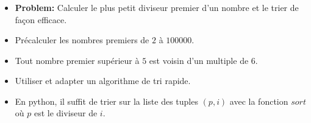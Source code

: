 \begin{frame}
    \frametitle{\problemtitle}
    \begin{itemize}
        \item<+-> \textbf{Problem:} Calculer le plus petit diviseur premier d'un nombre et le trier de façon efficace.
        \item<+-> Précalculer les nombres premiers de $2$ à $100000$.
        \item<+-> Tout nombre premier supérieur à $5$ est voisin d'un multiple de $6$.
        \item<+-> Utiliser et adapter un algorithme de tri rapide.
        \item<+-> En python, il suffit de trier sur la liste des tuples $(p, i)$ avec la fonction $sort$ où $p$ est le diviseur de $i$.


    \end{itemize}
\end{frame}
